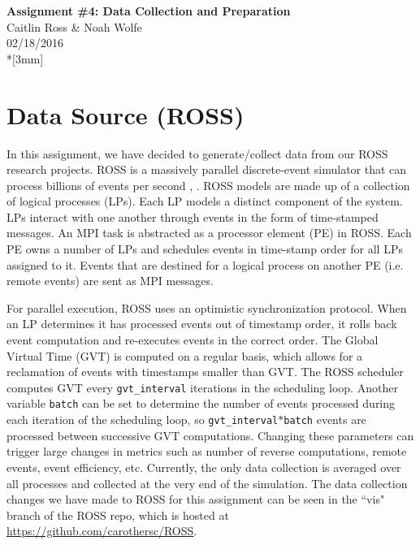\documentclass[12pt]{article}
\begin{document}
\thispagestyle{empty}
\begin{center}
{\Large\bf Assignment \#4: Data Collection and Preparation}
\vspace{3mm}
\\Caitlin Ross \& Noah Wolfe
\\02/18/2016
\\*[3mm]
\end{center}
\section{Data Source (ROSS)}
In this assignment, we have decided to generate/collect data from our ROSS research projects. 
ROSS is a massively parallel discrete-event simulator that
can process billions of events per second \cite{Holder}, \cite{Bauer}. ROSS
models are made up of a collection of logical processes (LPs).
Each LP models a distinct component of the system. LPs
interact with one another through events in the form of time-stamped messages. An MPI task is abstracted as a processor
element (PE) in ROSS. Each PE owns a number of LPs and
schedules events in time-stamp order for all LPs assigned to
it. Events that are destined for a logical process on another
PE (i.e. remote events) are sent as MPI messages. 

For parallel execution, ROSS uses an optimistic synchronization protocol.  When an LP determines it has processed events out of timestamp order, it rolls back event computation and re-executes events in the correct order.  The Global Virtual Time (GVT) is computed on a regular basis, which allows for a reclamation of events with timestamps smaller than GVT.  The ROSS scheduler computes GVT every \texttt{gvt\_interval} iterations in the scheduling loop.  Another variable \texttt{batch} can be set to determine the number of events processed during each iteration of the scheduling loop, so \texttt{gvt\_interval$*$batch} events are processed between successive GVT computations.  Changing these parameters can trigger large changes in metrics such as number of reverse computations, remote events, event efficiency, etc. Currently, the only data collection is averaged over all processes and collected at the very end of the simulation.  The data collection changes we have made to ROSS for this assignment can be seen in the ``vis" branch of the ROSS repo, which is hosted at \url{https://github.com/carothersc/ROSS}.  
\end{document}
